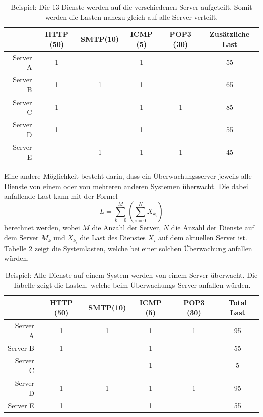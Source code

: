 \begin{table}[ht]
 \centering
 \begin{tabular}{r|c|c|c|c|c}
   & HTTP (50) & SMTP(10) & ICMP (5) & POP3 (30) & Zus\"atzliche Last \\
  \hline
  Server A & 1 &   & 1 &   & 55 \\
  \hline
  Server B & 1 & 1 & 1 &   & 65 \\
  \hline
  Server C & 1 &   & 1 & 1 & 85 \\
  \hline
  Server D & 1 &   & 1 &   & 55 \\
  \hline
  Server E &   & 1 & 1 & 1 & 45
 \end{tabular}
 \caption[Lastenvergleich, wenn die Dienste auf alle Server aufgeteilt werden]{Beispiel: Die 13 Dienste werden auf die verschiedenen Server aufgeteilt. Somit werden die Lasten nahezu gleich auf alle Server verteilt.\newline}
 \label{tbl:theorie-frag-shared}
\end{table}

Eine andere M\"oglichkeit besteht darin, dass ein \"Uberwachungsserver jeweils alle Dienste von einem oder von mehreren anderen Systemen \"uberwacht. Die dabei anfallende Last kann mit der Formel
\begin{equation}
L = \sum_{k=0}^{M} \left( \sum_{i=0}^{N} {X_{k_i}} \right)
\label{eq:theorie-frag-sysshared}
\end{equation}
berechnet werden, wobei $M$ die Anzahl der Server, $N$ die Anzahl der Dienste auf dem Server $M_k$ und $X_{k_i}$ die Last des Dienstes $X_i$ auf dem aktuellen Server ist. Tabelle \ref{tbl:theorie-frag-sysshared} zeigt die Systemlasten, welche bei einer solchen \"Uberwachung anfallen w\"urden.

\begin{table}[ht]
 \centering
 \begin{tabular}{r|c|c|c|c|c}
   & HTTP (50) & SMTP(10) & ICMP (5) & POP3 (30) & Total Last \\
  \hline
  Server A & 1 & 1 & 1 & 1 & 95 \\
  \hline
  Server B & 1 &   & 1 &   & 55 \\
  \hline
  Server C &   &   & 1 &   & 5 \\
  \hline
  Server D & 1 & 1 & 1 & 1 & 95 \\
  \hline
  Server E & 1 &   & 1 &   & 55
 \end{tabular}
 \caption[Lastenvergleich, wenn alle Dienste eines Servers \"uberwacht werden]{Beispiel: Alle Dienste auf einem System werden von einem Server \"uberwacht. Die Tabelle zeigt die Lasten, welche beim \"Uberwachungs-Server anfallen w\"urden.}
 \label{tbl:theorie-frag-sysshared}
\end{table}

